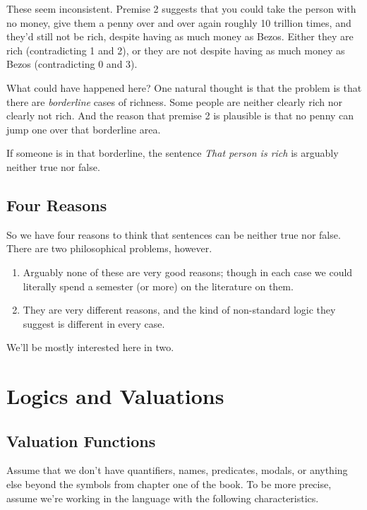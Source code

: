 \documentclass[
]{article}
\providecommand{\tightlist}{%
  \setlength{\itemsep}{0pt}\setlength{\parskip}{0pt}}\usepackage{longtable,booktabs,array}
\begin{document}
These seem inconsistent. Premise 2 suggests that you could take the
person with no money, give them a penny over and over again roughly 10
trillion times, and they'd still not be rich, despite having as much
money as Bezos. Either they are rich (contradicting 1 and 2), or they
are not despite having as much money as Bezos (contradicting 0 and 3).

What could have happened here? One natural thought is that the problem
is that there are \emph{borderline} cases of richness. Some people are
neither clearly rich nor clearly not rich. And the reason that premise 2
is plausible is that no penny can jump one over that borderline area.

If someone is in that borderline, the sentence \emph{That person is
rich} is arguably neither true nor false.

\hypertarget{four-reasons}{%
\subsection{Four Reasons}\label{four-reasons}}

So we have four reasons to think that sentences can be neither true nor
false. There are two philosophical problems, however.

\begin{enumerate}
\def\labelenumi{\arabic{enumi}.}
\tightlist
\item
  Arguably none of these are very good reasons; though in each case we
  could literally spend a semester (or more) on the literature on them.
\item
  They are very different reasons, and the kind of non-standard logic
  they suggest is different in every case.
\end{enumerate}

We'll be mostly interested here in two.

\hypertarget{logics-and-valuations}{%
\section{Logics and Valuations}\label{logics-and-valuations}}

\hypertarget{valuation-functions}{%
\subsection{Valuation Functions}\label{valuation-functions}}

Assume that we don't have quantifiers, names, predicates, modals, or
anything else beyond the symbols from chapter one of the book. To be
more precise, assume we're working in the language with the following
characteristics.
\end{document}
